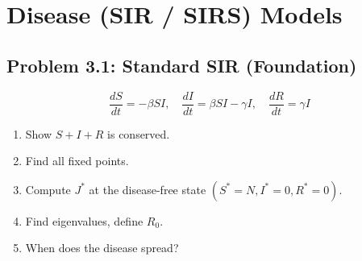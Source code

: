 \documentclass[10pt]{article}
\begin{document}
\newpage
\section{Disease (SIR / SIRS) Models}

\subsection{Problem 3.1: Standard SIR (Foundation)}

\begin{problem}
\[
\frac{dS}{dt} = -\beta SI, \quad \frac{dI}{dt} = \beta SI - \gamma I, \quad \frac{dR}{dt} = \gamma I
\]
\begin{enumerate}[label=(\alph*)]
\item Show $S+I+R$ is conserved.
\item Find all fixed points.
\item Compute $J^*$ at the disease-free state $(S^*=N, I^*=0, R^*=0)$.
\item Find eigenvalues, define $R_0$.
\item When does the disease spread?
\end{enumerate}
\end{problem}
\end{document}
